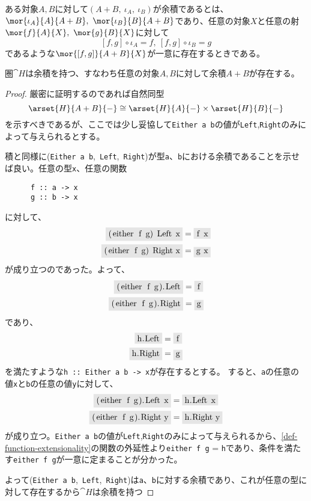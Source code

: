 \documentclass[uplatex,dvipdfmx]{jsarticle}
\newcommand{\pr}[1]{\colorbox[rgb]{0.9,0.9,0.9}{\lstinline{#1}}}
\begin{document}
  \begin{define}[余積の定義]\label{def-coproduct}
    ある対象$A,B$に対して$(A+B,\ \iota_A,\ \iota_B)$が余積であるとは、
    $\mor{\iota_A}{A}{A+B},\ \mor{\iota_B}{B}{A+B}$であり、任意の対象$X$と任意の射$\mor{f}{A}{X},\ \mor{g}{B}{X}$に対して
    \[[f,g]\circ\iota_A = f,\ [f,g]\circ\iota_B = g\]であるような$\mor{[f,g]}{A+B}{X}$が一意に存在するときである。
  \end{define}
  \begin{prop}\label{prop-h-has-coproduct}
    圏$\cat{H}$は余積を持つ、すなわち任意の対象$A,B$に対して余積$A+B$が存在する。
  \end{prop}
  \begin{proof}
    厳密に証明するのであれば自然同型\[\arset{H}{A+B}{-}\cong\arset{H}{A}{-}\times \arset{H}{B}{-}\]を示すべきであるが、ここでは少し妥協して\pr{Either a b}の値が\pr{Left},\pr{Right}のみによって与えられるとする。


    積と同様に(\pr{Either a b},\ \pr{Left},\ \pr{Right})が型\pr{a}、\pr{b}における余積であることを示せば良い。任意の型\pr{x}、任意の関数
    \begin{lstlisting}
      f :: a -> x
      g :: b -> x
    \end{lstlisting}
    に対して、
    \begin{align*}
      \pr{(either f g) Left x} &= \pr{f x}\\
      \pr{(either f g) Right x} &= \pr{g x}
    \end{align*}
    が成り立つのであった。よって、
    \begin{align*}
      \pr{(either f g).Left} &= \pr{f}\\
      \pr{(either f g).Right} &= \pr{g}
    \end{align*}
    であり、
    \begin{align*}
      \pr{h.Left} &= \pr{f}\\
      \pr{h.Right} &= \pr{g}
    \end{align*}
    を満たすような\pr{h :: Either a b -> x}が存在するとする。
    すると、\pr{a}の任意の値\pr{x}と\pr{b}の任意の値\pr{y}に対して、
    \begin{align*}
      \pr{(either f g).Left x} &= \pr{h.Left x}\\
      \pr{(either f g).Right y} &= \pr{h.Right y}
    \end{align*}
    が成り立つ。\pr{Either a b}の値が\pr{Left},\pr{Right}のみによって与えられるから、\ref{def-function-extensionality}の関数の外延性より\pr{either f g} = \pr{h}であり、条件を満たす\pr{either f g}が一意に定まることが分かった。

    よって(\pr{Either a b},\ \pr{Left},\ \pr{Right})は\pr{a}、\pr{b}に対する余積であり、これが任意の型に対して存在するから$\cat{H}$は余積を持つ
  \end{proof}
\end{document}

